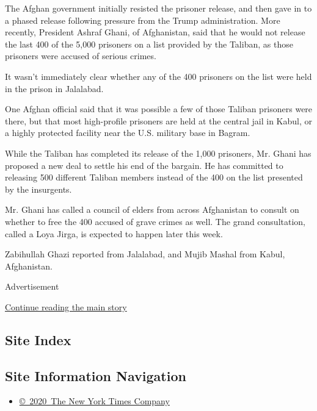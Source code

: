 The Afghan government initially resisted the prisoner release, and then
gave in to a phased release following pressure from the Trump
administration. More recently, President Ashraf Ghani, of Afghanistan,
said that he would not release the last 400 of the 5,000 prisoners on a
list provided by the Taliban, as those prisoners were accused of serious
crimes.

It wasn't immediately clear whether any of the 400 prisoners on the list
were held in the prison in Jalalabad.

One Afghan official said that it was possible a few of those Taliban
prisoners were there, but that most high-profile prisoners are held at
the central jail in Kabul, or a highly protected facility near the U.S.
military base in Bagram.

While the Taliban has completed its release of the 1,000 prisoners, Mr.
Ghani has proposed a new deal to settle his end of the bargain. He has
committed to releasing 500 different Taliban members instead of the 400
on the list presented by the insurgents.

Mr. Ghani has called a council of elders from across Afghanistan to
consult on whether to free the 400 accused of grave crimes as well. The
grand consultation, called a Loya Jirga, is expected to happen later
this week.

Zabihullah Ghazi reported from Jalalabad, and Mujib Mashal from Kabul,
Afghanistan.

Advertisement

\protect\hyperlink{after-bottom}{Continue reading the main story}

\hypertarget{site-index}{%
\subsection{Site Index}\label{site-index}}

\hypertarget{site-information-navigation}{%
\subsection{Site Information
Navigation}\label{site-information-navigation}}

\begin{itemize}
\tightlist
\item
  \href{https://help.nytimes.com/hc/en-us/articles/115014792127-Copyright-notice}{©~2020~The
  New York Times Company}
\end{itemize}

